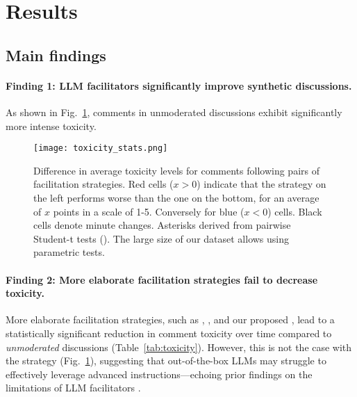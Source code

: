 %

\section{Results}
\label{sec:results}


\subsection{Main findings}
\label{ssec:results:main}

\paragraph{Finding 1: LLM facilitators significantly improve synthetic discussions.} As shown in Fig.~\ref{fig:toxicity_stats}, comments in unmoderated discussions exhibit significantly more intense toxicity.

\begin{figure}
	\texttt{[image: toxicity\_stats.png]}
	\centering
	\caption{Difference in average toxicity levels for comments following pairs of facilitation strategies. Red cells ($x>0$) indicate that the strategy on the left performs worse than the one on the bottom, for an average of $x$ points in a scale of 1-5. Conversely for blue ($x<0$) cells. Black cells denote minute changes. Asterisks derived from pairwise Student-t tests (\asterisknote). The large size of our dataset allows using parametric tests.}
	\label{fig:toxicity_stats}
\end{figure}

\paragraph{Finding 2: More elaborate facilitation strategies fail to decrease toxicity.}
More elaborate facilitation strategies, such as \emph{\strategyregroom}, \emph{\strategyconstrcomm}, and our proposed \emph{\strategymodgame}, lead to a statistically significant reduction in comment toxicity over time compared to \emph{unmoderated} discussions (Table~\ref{tab:toxicity}). However, this is not the case with the \emph{\strategynoinstr} strategy (Fig.~\ref{fig:toxicity_stats}), suggesting that out-of-the-box LLMs may struggle to effectively leverage advanced instructions---echoing prior findings on the limitations of LLM facilitators \cite{cho-etal-2024-language}.

